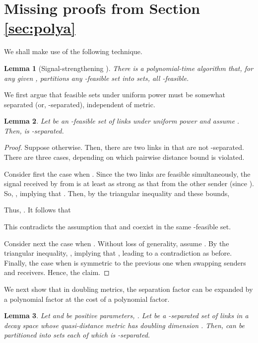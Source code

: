 \documentclass[11pt]{amsart}
\newtheorem{lemma}{Lemma}[section]
\begin{document}
\section{Missing proofs from Section \ref{sec:polya}}

We shall make use of the following technique.

\begin{lemma}[Signal-strengthening \cite{HW09}]
There is a polynomial-time algorithm that, for any given , 
partitions any -feasible set into 
 sets, all -feasible.
\label{lem:signal-strength}
\end{lemma}

We first argue that feasible sets under uniform power must be somewhat separated (or, -separated), independent of metric.

\begin{lemma}
Let  be an -feasible set of links under uniform power and assume
.
Then,  is -separated.
\label{lem:onezetasep}
\end{lemma}

\begin{proof}
Suppose otherwise. Then, there are two links  in 
 that are not -separated.
There are three cases, depending on which pairwise distance bound is violated.

Consider first the case when .  Since the two links are feasible
simultaneously, the signal received by  from  is at least as
strong as that from the other sender  (since ).
So, , implying that 
.
Then, by the triangular inequality and these bounds, 

Thus, .
It follows that
 
This contradicts the assumption that  and  coexist in the same -feasible set.

Consider next the case when .
Without loss of generality, assume  .
By the triangular inequality,
, 
implying that ,
leading to a contradiction as before.
Finally, the case when  is symmetric to the
previous one when swapping senders and receivers.
Hence, the claim.
\end{proof}

We next show that in doubling metrics, the separation factor can be
expanded by a polynomial factor at the cost of a polynomial factor.

\begin{lemma}
Let  and  be positive parameters, .
Let  be a -separated set of links 
in a decay space whose quasi-distance metric has doubling dimension .
Then,  can be partitioned into  sets each of which 
is -separated.
\label{lem:sep-strength}
\end{lemma}
\end{document}
